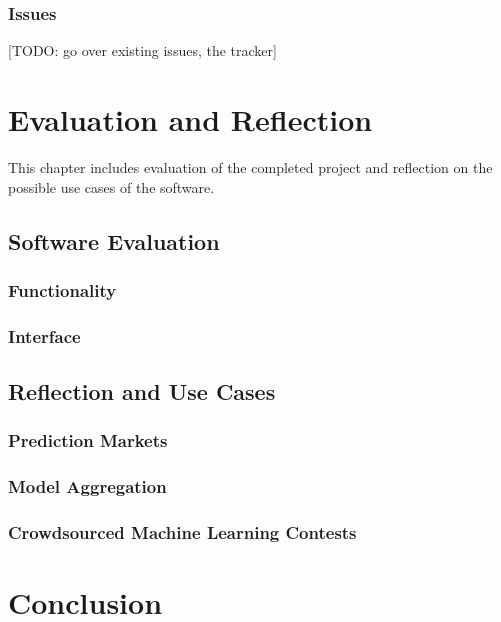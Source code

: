 \documentclass[bsc,frontabs,twoside,singlespacing,parskip,deptreport]{infthesis}     %
\begin{document}
\subsection{Issues}
    [TODO: go over existing issues, the tracker]
    
\chapter{Evaluation and Reflection}

This chapter includes evaluation of the completed project and reflection on the possible use cases of the software. 

\section{Software Evaluation}

\subsection{Functionality}

\subsection{Interface}


\section{Reflection and Use Cases}

\subsection{Prediction Markets}

\subsection{Model Aggregation}

\subsection{Crowdsourced Machine Learning Contests}

\chapter{Conclusion}






\end{document}
